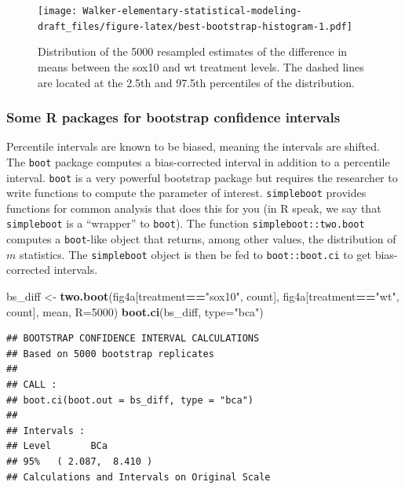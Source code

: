 \documentclass[]{book}
\newenvironment{Shaded}{\begin{snugshade}}{\end{snugshade}}
\newcommand{\KeywordTok}[1]{\textcolor[rgb]{0.13,0.29,0.53}{\textbf{#1}}}
\newcommand{\DataTypeTok}[1]{\textcolor[rgb]{0.13,0.29,0.53}{#1}}
\newcommand{\DecValTok}[1]{\textcolor[rgb]{0.00,0.00,0.81}{#1}}
\newcommand{\StringTok}[1]{\textcolor[rgb]{0.31,0.60,0.02}{#1}}
\newcommand{\OperatorTok}[1]{\textcolor[rgb]{0.81,0.36,0.00}{\textbf{#1}}}
\newcommand{\NormalTok}[1]{#1}
\begin{document}
\begin{figure}
\centering
\texttt{[image: Walker-elementary-statistical-modeling-draft\_files/figure-latex/best-bootstrap-histogram-1.pdf]}
\caption{\label{fig:best-bootstrap-histogram}Distribution of the 5000
resampled estimates of the difference in means between the sox10 and wt
treatment levels. The dashed lines are located at the 2.5th and 97.5th
percentiles of the distribution.}
\end{figure}

\subsubsection{Some R packages for bootstrap confidence
intervals}\label{some-r-packages-for-bootstrap-confidence-intervals}

Percentile intervals are known to be biased, meaning the intervals are
shifted. The \texttt{boot} package computes a bias-corrected interval in
addition to a percentile interval. \texttt{boot} is a very powerful
bootstrap package but requires the researcher to write functions to
compute the parameter of interest. \texttt{simpleboot} provides
functions for common analysis that does this for you (in R speak, we say
that \texttt{simpleboot} is a ``wrapper'' to \texttt{boot}). The
function \texttt{simpleboot::two.boot} computes a \texttt{boot}-like
object that returns, among other values, the distribution of \(m\)
statistics. The \texttt{simpleboot} object is then be fed to
\texttt{boot::boot.ci} to get bias-corrected intervals.

\begin{Shaded}
\begin{Highlighting}[]
\NormalTok{bs_diff <-}\StringTok{ }\KeywordTok{two.boot}\NormalTok{(fig4a[treatment}\OperatorTok{==}\StringTok{"sox10"}\NormalTok{, count],}
\NormalTok{                    fig4a[treatment}\OperatorTok{==}\StringTok{"wt"}\NormalTok{, count],}
\NormalTok{                    mean, }
                    \DataTypeTok{R=}\DecValTok{5000}\NormalTok{)}
\KeywordTok{boot.ci}\NormalTok{(bs_diff, }\DataTypeTok{type=}\StringTok{"bca"}\NormalTok{)}
\end{Highlighting}
\end{Shaded}

\begin{verbatim}
## BOOTSTRAP CONFIDENCE INTERVAL CALCULATIONS
## Based on 5000 bootstrap replicates
## 
## CALL : 
## boot.ci(boot.out = bs_diff, type = "bca")
## 
## Intervals : 
## Level       BCa          
## 95%   ( 2.087,  8.410 )  
## Calculations and Intervals on Original Scale
\end{verbatim}
\end{document}
